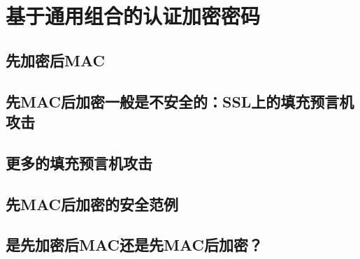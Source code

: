 \section{基于通用组合的认证加密密码}\label{sec:9-4}

\subsection{先加密后MAC}\label{subsec:9-4-1}

\begin{theorem}\label{theo:9-2}
	
\end{theorem}

\subsection{先MAC后加密一般是不安全的：SSL上的填充预言机攻击}\label{subsec:9-4-2}

\subsection{更多的填充预言机攻击}\label{subsec:9-4-3}

\subsection{先MAC后加密的安全范例}\label{subsec:9-4-4}

\begin{theorem}\label{theo:9-3}
	
\end{theorem}

\subsection{是先加密后MAC还是先MAC后加密？}\label{subsec:9-4-5}